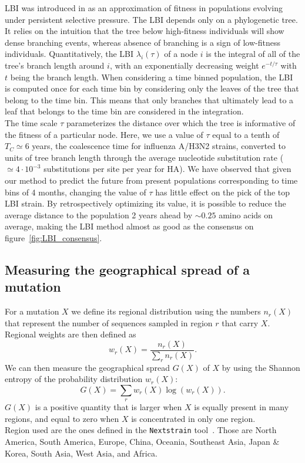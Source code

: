 \documentclass[reprint,amsmath,amssymb,superscriptaddress,showpacs,rmp]{revtex4-1}
\begin{document}
	LBI was introduced in \cite{neher_predicting_2014} as an approximation of fitness in populations evolving under persistent selective pressure. The LBI depends only on a phylogenetic tree. It relies on the intuition that the tree below high-fitness individuals will show dense branching events, whereas absence of branching is a sign of low-fitness individuals. Quantitatively, the LBI $\lambda_i(\tau)$ of a node $i$ is the integral of all of the tree's branch length around $i$, with an exponentially decreasing weight $e^{-t/\tau}$ with $t$ being the branch length. When considering a time binned population, the LBI is computed once for each time bin by considering only the leaves of the tree that belong to the time bin. This means that only branches that ultimately lead to a leaf that belongs to the time bin are considered in the integration.\\
	The time scale $\tau$ parameterizes the distance over which the tree is informative of the fitness of a particular node. Here, we use a value of $\tau$ equal to a tenth of $T_C\simeq6$ years, the coalescence time for influenza A/H3N2 strains, converted to units of tree branch length through the average nucleotide substitution rate ($\simeq 4\cdot 10^{-3}$ substitutions per site per year for HA). We have observed that given our method to predict the future from present populations corresponding to time bins of 4 months, changing the value of $\tau$ has little effect on the pick of the top LBI strain. By retrospectively optimizing its value, it is possible to reduce the average distance to the population 2 years ahead by $\sim0.25$ amino acids on average, making the LBI method almost as good as the consensus on figure~\ref{fig:LBI_consensus}.


\subsection*{Measuring the geographical spread of a mutation} %
\label{sub:measuring_the_geographical_spread_of_a_mutation}
	For a mutation $X$ we define its regional distribution using the numbers $n_r(X)$ that represent the number of sequences sampled in region $r$ that carry $X$. Regional weights are then defined as
	$$ w_r(X) = \frac{n_r(X)}{\sum_{r}n_r(X)}.$$
	We can then measure the geographical spread $G(X)$ of $X$ by using the Shannon entropy of the probability distribution $w_r(X)$:
	$$G(X) = \sum_r w_r(X)\log(w_r(X)).$$
	$G(X)$ is a positive quantity that is larger when $X$ is equally present in many regions, and equal to zero when $X$ is concentrated in only one region.\\
	Region used are the ones defined in the \texttt{Nextstrain} tool~\cite{10.1093/bioinformatics/bty407}. Those are {North America}, {South America}, {Europe}, {China}, {Oceania}, {Southeast Asia}, {Japan \& Korea}, {South Asia}, {West Asia}, and {Africa}.
\end{document}
